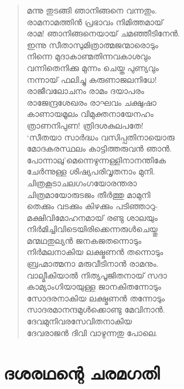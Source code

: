 \begin{verse}
മന്നു തുടങ്ങി ഞാനിങ്ങനെ വന്നതും.\\
രാമനാമത്തിന്‍ പ്രഭാവം നിമിത്തമായ്\\
രാമ! ഞാനിങ്ങനെയായ് ചമഞ്ഞീടിനേന്‍.\\
ഇന്നു സീതാസുമിത്രാത്മജന്മാരൊടും\\
നിന്നെ മുദാകാണ്മതിന്നവകാശവും\\
വന്നിതെനിക്കു മുന്നം ചെയ്ത പുണ്യവും\\
നന്നായ് ഫലിച്ചു കരുണാജലനിധേ!\\
രാജീവലോചനം രാമം ദയാപരം\\
രാജേന്ദ്രശേഖരം രാഘവം ചക്ഷുഷാ\\
കാണായമൂലം വിമുക്തനായേനഹം\\
ത്രാണനിപുണ! ത്രിദശകുലപതേ!\\
‘സീതയാ സാര്‍ദ്ധം വസിപ്പതിനായൊരു\\
മോദകരസ്ഥലം കാട്ടിത്തരുവന്‍ ഞാന്‍.\\
പോന്നാലു’മെന്നെഴുന്നള്ളിനാനന്തികേ\\
ചേര്‍ന്നുള്ള ശിഷ്യപരിവൃതനാം മുനി.\\
ചിത്രകൂടാചലഗംഗയോരന്തരാ\\
ചിത്രമായോരുടജം തീര്‍ത്തു മാമുനി\\
തെക്കും വടക്കും കിഴക്കും പടിഞ്ഞാറു-\\
മക്ഷിവിമോഹനമായ് രണ്ടു ശാലയും\\
നിര്‍മിച്ചിവിടെയിരിക്കെന്നരുള്‍ചെയ്തു\\
മന്മഥതുല്യന്‍ ജനകജതന്നൊടും\\
നിര്‍മലനാകിയ ലക്ഷ്മണന്‍ തന്നൊടും\\
ബ്രഹ്മാത്മനാ മരുവീടിനാന്‍ രാമനും.\\
വാല്മീകിയാല്‍ നിത്യപൂജിതനായ് സദാ\\
കാമ്യാംഗിയായുള്ള ജാനകിതന്നോടും\\
സോദരനാകിയ ലക്ഷ്മണന്‍ തന്നോടും\\
സാദരമാനന്ദമുള്‍ക്കൊണ്ടു മേവിനാന്‍.\\
ദേവമുനിവരസേവിതനാകിയ\\
ദേവരാജന്‍ ദിവി വാഴുന്നതു പോലെ.
\end{verse}


\section{ദശരഥന്റെ ചരമഗതി}


